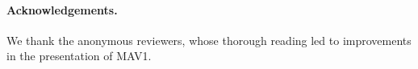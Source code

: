 \documentclass[UKenglish,acmsmall,authorversion]{acmart}
\theoremstyle{plain}
\begin{document}

\paragraph*{Acknowledgements.}
We thank the anonymous reviewers, whose thorough reading led to improvements in the presentation of \textsf{MAV1}.









\newpage
\end{document}
